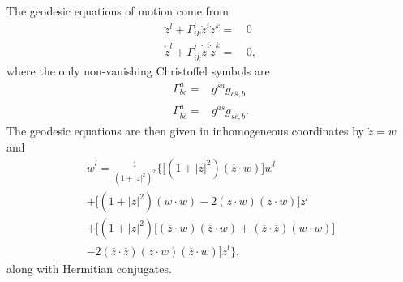 \documentclass{slides}
\begin{document}
The geodesic equations of motion come from
\begin{equation*}
\begin{split}
    \ddot{z}^l + \Gamma^l_{ik}\dot{z}^i\dot{z}^k =&\, 0\\
    \ddot{\overline{z}}^l + \Gamma^{\overline{l}}_{\overline{i}\overline{k}}
            \dot{\overline{z}}^i\dot{\overline{z}}^k =&\, 0,
\end{split}
\label{e:geodesics}
\end{equation*}
where the only non-vanishing Christoffel symbols are
\begin{equation*}
\begin{split}
    \Gamma^a_{bc} =& g^{\overline{s}a} g_{c\overline{s},b}\\
    \Gamma^{\overline{a}}_{\overline{b}\overline{c}} =& g^{\overline{a}s} 
                            g_{s\overline{c},b}.
\end{split}
\label{e:xsymb}
\end{equation*}
The geodesic equations are then given in inhomogeneous coordinates by
$\dot{z}=w$ and
\begin{multline*}
    \dot{w}^l = \frac{1}{ \left( 1 + \left| z\right|^2 \right)^2 }
        \biggl\lbrace
            \biggl[ \left( 1 + \left| z\right|^2 \right) 
                    \left( \overline{z}\cdot w \right)
            \biggr] w^l\\
            +
            \biggl[ \left( 1 + \left| z\right|^2 \right)\left( w\cdot w \right)
                    - 2\left( z\cdot w \right)\left( \overline{z}\cdot w \right)
            \biggr] \overline{z}^l\\
            +
            \biggl[ \left( 1 + \left| z\right|^2 \right) 
                    \bigl[ 
                      \left(\overline{z}\cdot w\right)\left(\overline{z}\cdot w\right)
                      +\left(\overline{z}\cdot\overline{z}\right)\left(w\cdot w\right)
                    \bigr]\\
                    - 2\left(\overline{z}\cdot\overline{z}\right) 
                        \left( z\cdot w \right)\left( \overline{z}\cdot w \right)
            \biggr] z^l
        \biggr\rbrace,
\label{e:detailedGeodesics}
\end{multline*}
along with Hermitian conjugates.


\pagebreak
\end{document}
